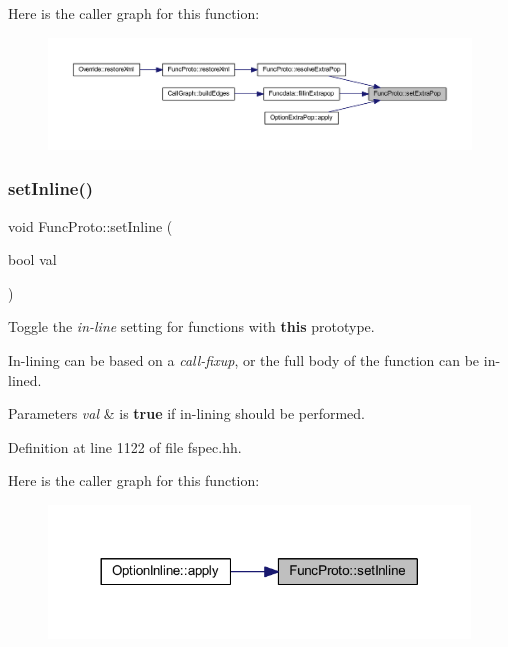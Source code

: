 Here is the caller graph for this function\+:
\nopagebreak
\begin{figure}[H]
\begin{center}
\leavevmode
\includegraphics[width=350pt]{class_func_proto_af32fa24642ff5423ec167e6f8bca065a_icgraph}
\end{center}
\end{figure}
\mbox{\label{class_func_proto_a843bc3ca11536028c5cb00ce5479182d}} 
\subsubsection{\texorpdfstring{setInline()}{setInline()}}
{\footnotesize\ttfamily void Func\+Proto\+::set\+Inline (\begin{DoxyParamCaption}\item[{bool}]{val }\end{DoxyParamCaption})\hspace{0.3cm}{\ttfamily [inline]}}



Toggle the {\itshape in-\/line} setting for functions with {\bfseries{this}} prototype. 

In-\/lining can be based on a {\itshape call-\/fixup}, or the full body of the function can be in-\/lined. 
\begin{DoxyParams}{Parameters}
{\em val} & is {\bfseries{true}} if in-\/lining should be performed. \\
\hline
\end{DoxyParams}


Definition at line 1122 of file fspec.\+hh.

Here is the caller graph for this function\+:
\nopagebreak
\begin{figure}[H]
\begin{center}
\leavevmode
\includegraphics[width=317pt]{class_func_proto_a843bc3ca11536028c5cb00ce5479182d_icgraph}
\end{center}
\end{figure}
\mbox{\label{class_func_proto_ad5f36aaa3e2d1d7cdc90d101065abbc0}} 
